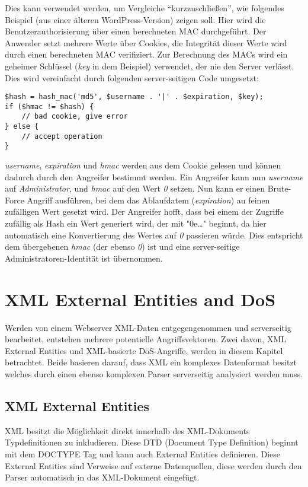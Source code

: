 Dies kann verwendet werden, um Vergleiche ``kurzzuschließen'', wie folgendes Beispiel (aus einer älteren WordPress-Version) zeigen soll. Hier wird die Benutzerauthorisierung über einen berechneten MAC durchgeführt. Der Anwender setzt mehrere Werte über Cookies, die Integrität dieser Werte wird durch einen berechneten MAC verifiziert. Zur Berechnung des MACs wird ein geheimer Schlüssel (\textit{key} in dem Beispiel) verwendet, der nie den Server verlässt. Dies wird vereinfacht durch folgenden server-seitigen Code umgesetzt:

\begin{verbatim}
$hash = hash_mac('md5', $username . '|' . $expiration, $key);
if ($hmac != $hash) {
	// bad cookie, give error
} else {
	// accept operation
}
\end{verbatim}

\textit{username}, \textit{expiration} und \textit{hmac} werden aus dem Cookie gelesen und können dadurch durch den Angreifer bestimmt werden. Ein Angreifer kann nun \textit{username} auf \textit{Administrator}, und \textit{hmac} auf den Wert \textit{0} setzen. Nun kann er einen Brute-Force Angriff ausführen, bei dem das Ablaufdatem (\textit{expiration}) au feinen zufälligen Wert gesetzt wird. Der Angreifer hofft, dass bei einem der Zugriffe zufällig als Hash ein Wert generiert wird, der mit "0e\ldots" beginnt, da hier automatisch eine Konvertierung des Wertes auf \textit{0} passieren würde. Dies entspricht dem übergebenen \textit{hmac} (der ebenso \textit{0}) ist und eine server-seitige Administratoren-Identität ist übernommen.

\section{XML External Entities and DoS}

Werden von einem Webserver XML-Daten entgegengenommen und serverseitig bearbeitet, entstehen mehrere potentielle Angriffsvektoren. Zwei davon, XML External Entities und XML-basierte DoS-Angriffe, werden in diesem Kapitel betrachtet. Beide basieren darauf, dass XML ein komplexes Datenformat besitzt welches durch einen ebenso komplexen Parser serverseitig analysiert werden muss.

\subsection{XML External Entities}

XML besitzt die Möglichkeit direkt innerhalb des XML-Dokuments Typdefinitionen zu inkludieren. Diese DTD (Document Type Definition) beginnt mit dem DOCTYPE Tag und kann auch External Entities definieren. Diese External Entities sind Verweise auf externe Datenquellen, diese werden durch den Parser automatisch in das XML-Dokument eingefügt.

